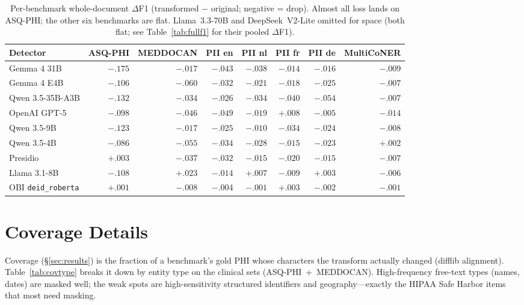\documentclass[pmlr,twocolumn,10pt]{jmlr}
\newcommand{\tp}[1]{\texttt{#1}}
\begin{document}
\begin{table}[tbp]\centering\small
\begin{tabular}{lrrrrrrr}
\toprule
Detector & ASQ-PHI & MEDDOCAN & PII en & PII nl & PII fr & PII de & MultiCoNER\\
\midrule
Gemma 4 31B & $-.175$ & $-.017$ & $-.043$ & $-.038$ & $-.014$ & $-.016$ & $-.009$\\
Gemma 4 E4B & $-.106$ & $-.060$ & $-.032$ & $-.021$ & $-.018$ & $-.025$ & $-.007$\\
Qwen 3.5-35B-A3B & $-.132$ & $-.034$ & $-.026$ & $-.034$ & $-.040$ & $-.054$ & $-.007$\\
OpenAI GPT-5 & $-.098$ & $-.046$ & $-.049$ & $-.019$ & $+.008$ & $-.005$ & $-.014$\\
Qwen 3.5-9B & $-.123$ & $-.017$ & $-.025$ & $-.010$ & $-.034$ & $-.024$ & $-.008$\\
Qwen 3.5-4B & $-.086$ & $-.055$ & $-.034$ & $-.028$ & $-.015$ & $-.023$ & $+.002$\\
Presidio & $+.003$ & $-.037$ & $-.032$ & $-.015$ & $-.020$ & $-.015$ & $-.007$\\
Llama 3.1-8B & $-.108$ & $+.023$ & $-.014$ & $+.007$ & $-.009$ & $+.003$ & $-.006$\\
OBI \tp{deid\_roberta} & $+.001$ & $-.008$ & $-.004$ & $-.001$ & $+.003$ & $-.002$ & $-.001$\\
\bottomrule
\end{tabular}
\caption{Per-benchmark whole-document $\Delta$F1 (transformed $-$ original; negative = drop). Almost all loss lands on ASQ-PHI; the other six benchmarks are flat. Llama~3.3-70B and DeepSeek~V2-Lite omitted for space (both flat; see Table~\ref{tab:fullf1} for their pooled $\Delta$F1).}\label{tab:perbench}
\end{table}


\section{Coverage Details}\label{app:coverage}
Coverage (\S\ref{sec:results}) is the fraction of a benchmark's gold PHI whose characters the transform actually changed (difflib alignment). Table~\ref{tab:covtype} breaks it down by entity type on the clinical sets (ASQ-PHI~+~MEDDOCAN). High-frequency free-text types (names, dates) are masked well; the weak spots are high-sensitivity structured identifiers and geography---exactly the HIPAA Safe Harbor items that most need masking.
\end{document}
